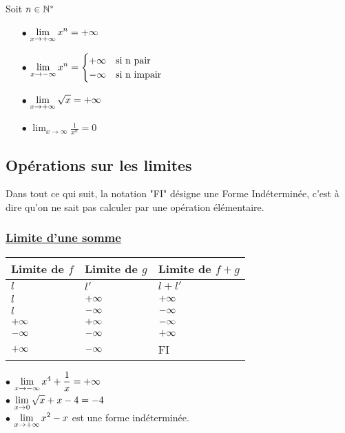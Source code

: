 Soit $ n\in\mathbb{N}^* $
\begin{center}

\begin{itemize}
 \item[$  \bullet$] $ \displaystyle\lim_{x \to +\infty}x^{n}= +\infty$ 
  \item[$  \bullet$] $\displaystyle \lim_{x \to -\infty}x^{n}= \begin{cases}
+\infty & \text{si n pair} \\
-\infty & \text{si  n impair}
\end{cases}$ 
  \item[$  \bullet$] $ \displaystyle\lim_{x \to +\infty}\sqrt{x}=+\infty$ 
  \item[$  \bullet$]$\displaystyle \lim_{x \to \infty} \frac{1}{x^{n}}=0$ 
 \end{itemize}


\end{center}


\subsection{  Opérations sur les limites}
 Dans tout ce qui suit, la notation "FI" désigne une Forme Indéterminée, c'est à dire qu'on ne sait pas calculer par une opération élémentaire.

\subsubsection*{ \underline{Limite d'une somme}}

\begin{tabularx}{\textwidth}{|X|X|X|}
\hline
Limite de $ f $ & Limite de $ g $ &Limite de $ f+g $ \\
\hline
$ l $& $ l' $&$ l+l' $ \\
\hline
 $ l $& $ +\infty $& $ +\infty $\\
\hline
$ l $ & $ -\infty $& $ -\infty $\\
\hline
$ +\infty $& $ +\infty $& $ -\infty $\\
\hline
$ -\infty $& $ -\infty $&$ +\infty $ \\
\hline
$ +\infty $& $ -\infty $& FI\\
\hline

\end{tabularx}

\begin{example}

$ \bullet $  \; $ \displaystyle \lim_{x\to -\infty}x^{4}+\frac{1}{x} =+\infty$\\
$\bullet $  \; $ \displaystyle \lim_{x\to 0}\sqrt{x}+x-4 =-4$\\
$ \bullet $  \; $ \displaystyle \lim_{x\to +\infty}x^{2}-x $ \;est une forme indéterminée.

\end{example}




